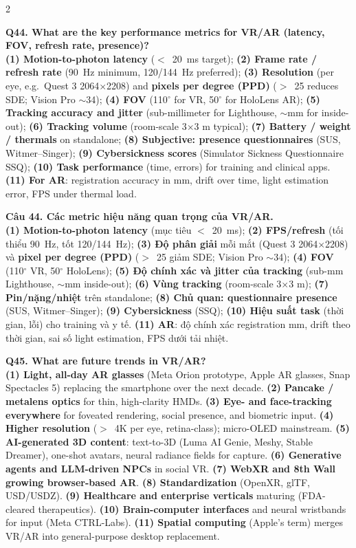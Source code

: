 \begin{paracol}{2}
\switchcolumn*

\textbf{Q44. What are the key performance metrics for VR/AR (latency, FOV, refresh rate, presence)?}\\
\textbf{(1) Motion-to-photon latency} ($<$~20~ms target); \textbf{(2) Frame rate / refresh rate} (90~Hz minimum, 120/144~Hz preferred); \textbf{(3) Resolution} (per eye, e.g.\ Quest 3 2064$\times$2208) and \textbf{pixels per degree (PPD)} ($>$~25 reduces SDE; Vision Pro $\sim$34); \textbf{(4) FOV} (110$^\circ$ for VR, 50$^\circ$ for HoloLens AR); \textbf{(5) Tracking accuracy and jitter} (sub-millimeter for Lighthouse, $\sim$mm for inside-out); \textbf{(6) Tracking volume} (room-scale 3$\times$3 m typical); \textbf{(7) Battery / weight / thermals} on standalone; \textbf{(8) Subjective: presence questionnaires} (SUS, Witmer--Singer); \textbf{(9) Cybersickness scores} (Simulator Sickness Questionnaire SSQ); \textbf{(10) Task performance} (time, errors) for training and clinical apps. \textbf{(11) For AR}: registration accuracy in mm, drift over time, light estimation error, FPS under thermal load.

\switchcolumn

\textbf{Câu 44. Các metric hiệu năng quan trọng của VR/AR.}\\
\textbf{(1) Motion-to-photon latency} (mục tiêu $<$~20~ms); \textbf{(2) FPS/refresh} (tối thiểu 90~Hz, tốt 120/144~Hz); \textbf{(3) Độ phân giải} mỗi mắt (Quest 3 2064$\times$2208) và \textbf{pixel per degree (PPD)} ($>$~25 giảm SDE; Vision Pro $\sim$34); \textbf{(4) FOV} (110$^\circ$ VR, 50$^\circ$ HoloLens); \textbf{(5) Độ chính xác và jitter của tracking} (sub-mm Lighthouse, $\sim$mm inside-out); \textbf{(6) Vùng tracking} (room-scale 3$\times$3 m); \textbf{(7) Pin/nặng/nhiệt} trên standalone; \textbf{(8) Chủ quan: questionnaire presence} (SUS, Witmer--Singer); \textbf{(9) Cybersickness} (SSQ); \textbf{(10) Hiệu suất task} (thời gian, lỗi) cho training và y tế. \textbf{(11) AR}: độ chính xác registration mm, drift theo thời gian, sai số light estimation, FPS dưới tải nhiệt.

\switchcolumn*

\textbf{Q45. What are future trends in VR/AR?}\\
\textbf{(1) Light, all-day AR glasses} (Meta Orion prototype, Apple AR glasses, Snap Spectacles 5) replacing the smartphone over the next decade. \textbf{(2) Pancake / metalens optics} for thin, high-clarity HMDs. \textbf{(3) Eye- and face-tracking everywhere} for foveated rendering, social presence, and biometric input. \textbf{(4) Higher resolution} ($>$~4K per eye, retina-class); micro-OLED mainstream. \textbf{(5) AI-generated 3D content}: text-to-3D (Luma AI Genie, Meshy, Stable Dreamer), one-shot avatars, neural radiance fields for capture. \textbf{(6) Generative agents and LLM-driven NPCs} in social VR. \textbf{(7) WebXR and \textbf{8th Wall} growing browser-based AR}. \textbf{(8) Standardization} (OpenXR, glTF, USD/USDZ). \textbf{(9) Healthcare and enterprise verticals} maturing (FDA-cleared therapeutics). \textbf{(10) Brain-computer interfaces} and neural wristbands for input (Meta CTRL-Labs). \textbf{(11) Spatial computing} (Apple's term) merges VR/AR into general-purpose desktop replacement.


\end{paracol}
